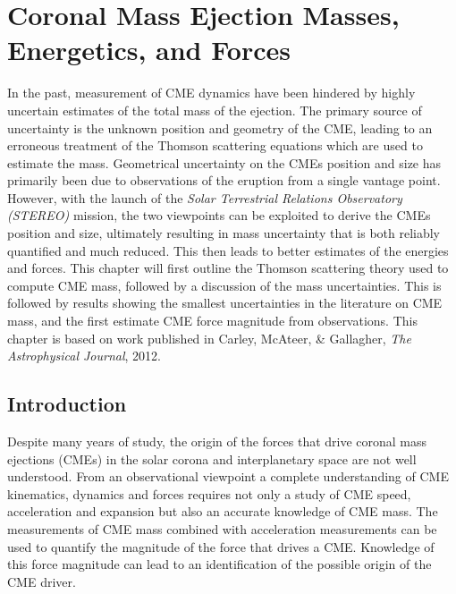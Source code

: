 
\singlespacing
\chapter{Coronal Mass Ejection Masses, Energetics, and Forces} 
\label{chap:4}
\vspace{-6mm}
\doublespacing
In the past, measurement of CME dynamics have been hindered by highly uncertain estimates of the total mass of the ejection. The primary source of uncertainty is the unknown position and geometry of the CME, leading to an erroneous treatment of the Thomson scattering equations which are used to estimate the mass. Geometrical uncertainty on the CMEs position and size has primarily been due to observations of the eruption from a single vantage point. However, with the launch of the {\it Solar Terrestrial Relations Observatory (STEREO)} mission, the two viewpoints can be exploited to derive the CMEs position and size, ultimately resulting in mass uncertainty that is both reliably quantified and much reduced. This then leads to better estimates of the energies and forces. This chapter will first outline the Thomson scattering theory used to compute CME mass, followed by a discussion of the mass uncertainties. This is followed by results showing the smallest uncertainties in the literature on CME mass, and the first estimate CME force magnitude from observations. This chapter is based on work published in Carley, McAteer, \& Gallagher, {\it The Astrophysical Journal}, 2012.

\section{Introduction}\label{sec:1}

Despite many years of study, the origin of the forces that drive coronal mass ejections (CMEs) in the solar corona and interplanetary space are not well understood. From an observational viewpoint a complete understanding of CME kinematics, dynamics and forces requires not only a study of CME speed, acceleration and expansion but also an accurate knowledge of CME mass.  The measurements of CME mass combined with acceleration measurements can be used to quantify the magnitude of the force that drives a CME. Knowledge of this force magnitude can lead to an identification of the possible origin of the CME driver. 

